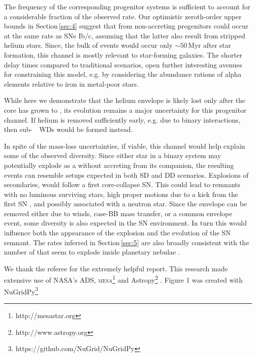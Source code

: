 \documentclass[twocolumn]{aa}
\begin{document}
The frequency of the corresponding progenitor systems 
is sufficient to account for a considerable fraction of the observed \ia  rate.  Our optimistic zeroth-order upper bounds in  Section\,\ref{sec:4} suggest that \ias from non-accreting progenitors could occur at the same rate as SNe Ib/c, assuming that the latter also result from stripped helium stars. Since, the bulk of events would occur only $\sim 50$\,Myr after star formation, this channel is mostly relevant to star-forming galaxies. The shorter delay times compared to traditional \ia scenarios, open further interesting avenues for constraining this model, e.g.  by considering the abundance rations of alpha elements relative to iron in metal-poor stars. 

 While here we demonstrate that the helium envelope is  likely lost only  after the core has grown to \mch, its evolution remains a major uncertainty for this progenitor channel. If helium is removed sufficiently early, e.g. due to binary interactions, then sub-\mch~\one\ WDs would be formed instead. 
 
In spite of the mass-loss 
uncertainties, if viable, this channel would help explain some of the observed \ia diversity. Since either star in a binary system may potentially explode 
as a \ia without accreting from its  companion, the resulting events can resemble setups expected in both SD and DD scenarios. Explosions of 
secondaries, would follow a first core-collapse SN. This 
could lead to \ia remnants with no luminous surviving stars, high proper motions due to a kick from the first SN \cite[like the Kepler SN remnant,][]{Chiotellis:2011jy}, and  possibly associated with a neutron star. 
Since the  envelope can be removed either due to winds, case-BB mass transfer, or a common envelope event, some diversity is also expected in 
the SN environment. In turn this would influence both the 
appearance of the explosion and the evolution of the SN remnant. The rates inferred in Section\,\ref{sec:5} are also broadly consistent with the 
number of \ias that seem to explode inside planetary 
nebulae \citep[$\sim 20\%$;][]{Tsebrenko:2014kea}.  
          



\begin{acknowledgements}
We thank the referee for the extremely helpful report. 
 This research made extensive use of NASA's ADS, \textsc{mesa}\footnote{http://mesastar.org} \citep{Paxton:2010ji,Paxton:2013pj,Paxton:2015jva,Paxton:2017eie} and Astropy\footnote{http://www.astropy.org} \citep{Price-Whelan:2018hus}. Figure 1 was created with NuGridPy\footnote{https://github.com/NuGrid/NuGridPy}
\end{acknowledgements}


 

\end{document}
